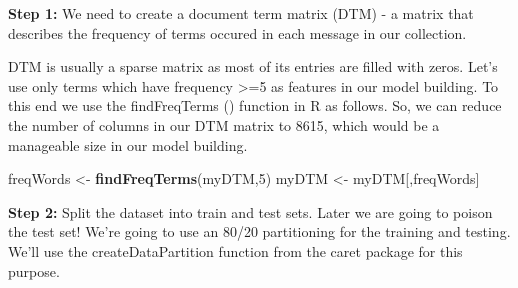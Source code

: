 \documentclass[]{article}
\newenvironment{Shaded}{\begin{snugshade}}{\end{snugshade}}
\newcommand{\CommentTok}[1]{\textcolor[rgb]{0.56,0.35,0.01}{\textit{#1}}}
\newcommand{\DataTypeTok}[1]{\textcolor[rgb]{0.13,0.29,0.53}{#1}}
\newcommand{\DecValTok}[1]{\textcolor[rgb]{0.00,0.00,0.81}{#1}}
\newcommand{\FloatTok}[1]{\textcolor[rgb]{0.00,0.00,0.81}{#1}}
\newcommand{\KeywordTok}[1]{\textcolor[rgb]{0.13,0.29,0.53}{\textbf{#1}}}
\newcommand{\NormalTok}[1]{#1}
\newcommand{\OperatorTok}[1]{\textcolor[rgb]{0.81,0.36,0.00}{\textbf{#1}}}
\newcommand{\OtherTok}[1]{\textcolor[rgb]{0.56,0.35,0.01}{#1}}
\newcommand{\StringTok}[1]{\textcolor[rgb]{0.31,0.60,0.02}{#1}}
\begin{document}
\textbf{Step 1:} We need to create a document term matrix (DTM) - a
matrix that describes the frequency of terms occured in each message in
our collection.

\begin{Shaded}
\end{Shaded}

DTM is usually a sparse matrix as most of its entries are filled with
zeros. Let's use only terms which have frequency \textgreater{}=5 as
features in our model building. To this end we use the findFreqTerms ()
function in R as follows. So, we can reduce the number of columns in our
DTM matrix to 8615, which would be a manageable size in our model
building.

\begin{Shaded}
\begin{Highlighting}[]
\NormalTok{freqWords <-}\StringTok{ }\KeywordTok{findFreqTerms}\NormalTok{(myDTM,}\DecValTok{5}\NormalTok{)}
\NormalTok{myDTM <-}\StringTok{ }\NormalTok{myDTM[,freqWords]}
\end{Highlighting}
\end{Shaded}

\textbf{Step 2:} Split the dataset into train and test sets. Later we
are going to poison the test set! We're going to use an 80/20
partitioning for the training and testing. We'll use the
createDataPartition function from the caret package for this purpose.

\begin{Shaded}
\end{Shaded}
\end{document}
